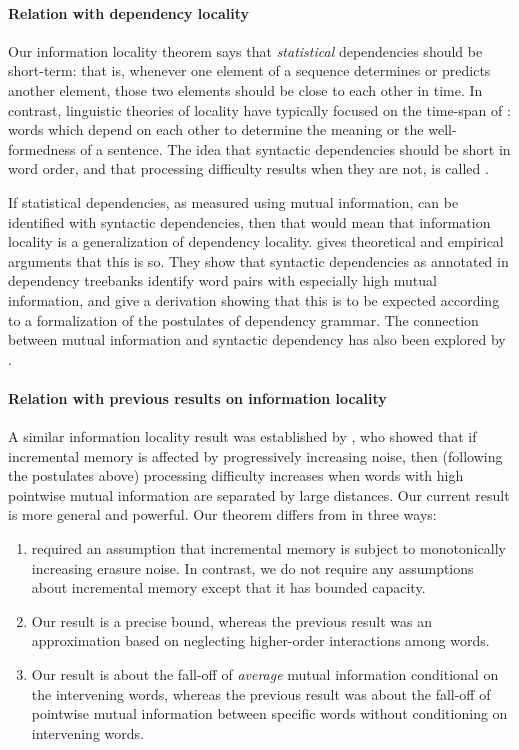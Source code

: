 \paragraph{Relation with dependency locality}
Our information locality theorem says that \emph{statistical} dependencies should be short-term: that is, whenever one element of a sequence determines or predicts another element, those two elements should be close to each other in time. In contrast, linguistic theories of locality have typically focused on the time-span of : words which depend on each other to determine the meaning or the well-formedness of a sentence. The idea that syntactic dependencies should be short in word order, and that processing difficulty results when they are not, is called . 

If statistical dependencies, as measured using mutual information, can be identified with syntactic dependencies, then that would mean that information locality is a generalization of dependency locality. \citet{futrell2019syntactic} gives theoretical and empirical arguments that this is so. They show that syntactic dependencies as annotated in dependency treebanks identify word pairs with especially high mutual information, and give a derivation showing that this is to be expected according to a formalization of the postulates of dependency grammar. The connection between mutual information and syntactic dependency has also been explored by \citet{}. 

\paragraph{Relation with previous results on information locality} A similar information locality result was established by \citet{futrell-noisy-context-2017}, who showed that if incremental memory is affected by progressively increasing noise, then (following the postulates above) processing difficulty increases when words with high pointwise mutual information are separated by large distances. Our current result is more general and powerful. Our theorem differs from \citet{futrell-noisy-context-2017} in three ways:
\begin{enumerate}
    \item \citet{futrell-noisy-context-2017} required an assumption that incremental memory is subject to monotonically increasing erasure noise. In contrast, we do not require any assumptions about incremental memory except that it has bounded capacity.
    \item Our result is a precise bound, whereas the previous result was an approximation based on neglecting higher-order interactions among words.
    \item Our result is about the fall-off of \emph{average} mutual information conditional on the intervening words, whereas the previous result was about the fall-off of pointwise mutual information between specific words without conditioning on intervening words.
\end{enumerate}

